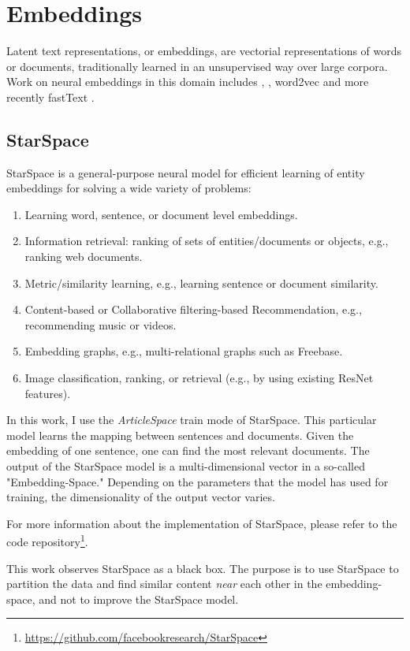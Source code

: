 \section{Embeddings}
\label{Embeddigns}
Latent text representations, or embeddings, are vectorial representations of words or documents, traditionally learned in an unsupervised way over large corpora. Work on neural embeddings in this domain includes \cite{Bengio2003}, 
\cite{Collobert2011}, word2vec \cite{goldberg2014word2vec} and more recently fastText \cite{joulin2016fasttext}.

\subsection{StarSpace}
\label{subsec:StarSpace}
StarSpace \cite{StarSpace} is a general-purpose neural model for efficient learning of entity embeddings for solving a wide variety of problems:

\begin{enumerate}
	\item Learning word, sentence, or document level embeddings.
	\item Information retrieval: ranking of sets of entities/documents or objects, e.g., ranking web documents.
	\item Metric/similarity learning, e.g., learning sentence or document similarity.
	\item Content-based or Collaborative filtering-based Recommendation, e.g., recommending music or videos.
	\item Embedding graphs, e.g., multi-relational graphs such as Freebase.
	\item Image classification, ranking, or retrieval (e.g., by using existing ResNet features).
\end{enumerate}

In this work, I use the \emph{ArticleSpace} train mode of StarSpace. This particular model learns the mapping between sentences and documents. Given the embedding of one sentence, one can find the most relevant documents. The output of the StarSpace model is a multi-dimensional vector in a so-called "Embedding-Space." Depending on the parameters that the model has used for training, the dimensionality of the output vector varies. 

For more information about the implementation of StarSpace, please refer to the code repository\footnote{\url{https://github.com/facebookresearch/StarSpace}}.


This work observes StarSpace as a black box. The purpose is to use StarSpace to partition the data and find similar content \emph{near} each other in the embedding-space, and not to improve the StarSpace model.

